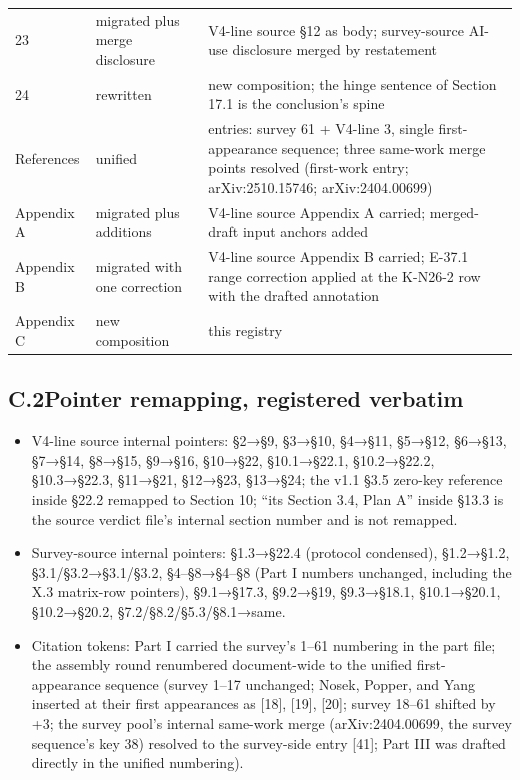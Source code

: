 \documentclass[11pt]{article}
\begin{document}
\begin{longtable}{@{}l p{} >{\raggedright\arraybackslash}p{}@{}}
23 & migrated plus merge disclosure & V4-line source §12 as body; survey-source AI-use disclosure merged by restatement \\
24 & rewritten & new composition; the hinge sentence of Section 17.1 is the conclusion's spine \\
References & unified & 64 entries: survey 61 + V4-line 3, single first-appearance sequence; three same-work merge points resolved (first-work entry; arXiv:2510.15746; arXiv:2404.00699) \\
Appendix A & migrated plus additions & V4-line source Appendix A carried; merged-draft input anchors added \\
Appendix B & migrated with one correction & V4-line source Appendix B carried; E-37.1 range correction applied at the K-N26-2 row with the drafted annotation \\
Appendix C & new composition & this registry \\
\bottomrule
\end{longtable}
\endgroup
\subsection*{C.2\quad Pointer remapping, registered verbatim}
\begin{itemize}[leftmargin=1.6em,itemsep=2pt,parsep=0pt,topsep=3pt]
\item V4-line source internal pointers: §2→§9, §3→§10, §4→§11, §5→§12, §6→§13, §7→§14, §8→§15, §9→§16, §10→§22, §10.1→§22.1, §10.2→§22.2, §10.3→§22.3, §11→§21, §12→§23, §13→§24; the v1.1 §3.5 zero-key reference inside §22.2 remapped to Section 10; ``its Section 3.4, Plan A'' inside §13.3 is the source verdict file's internal section number and is not remapped.
\item Survey-source internal pointers: §1.3→§22.4 (protocol condensed), §1.2→§1.2, §3.1/§3.2→§3.1/§3.2, §4–§8→§4–§8 (Part I numbers unchanged, including the X.3 matrix-row pointers), §9.1→§17.3, §9.2→§19, §9.3→§18.1, §10.1→§20.1, §10.2→§20.2, §7.2/§8.2/§5.3/§8.1→same.
\item Citation tokens: Part I carried the survey's 1–61 numbering in the part file; the assembly round renumbered document-wide to the unified first-appearance sequence (survey 1–17 unchanged; Nosek, Popper, and Yang inserted at their first appearances as [18], [19], [20]; survey 18–61 shifted by +3; the survey pool's internal same-work merge (arXiv:2404.00699, the survey sequence's key 38) resolved to the survey-side entry [41]; Part III was drafted directly in the unified numbering).
\end{itemize}
\end{document}
